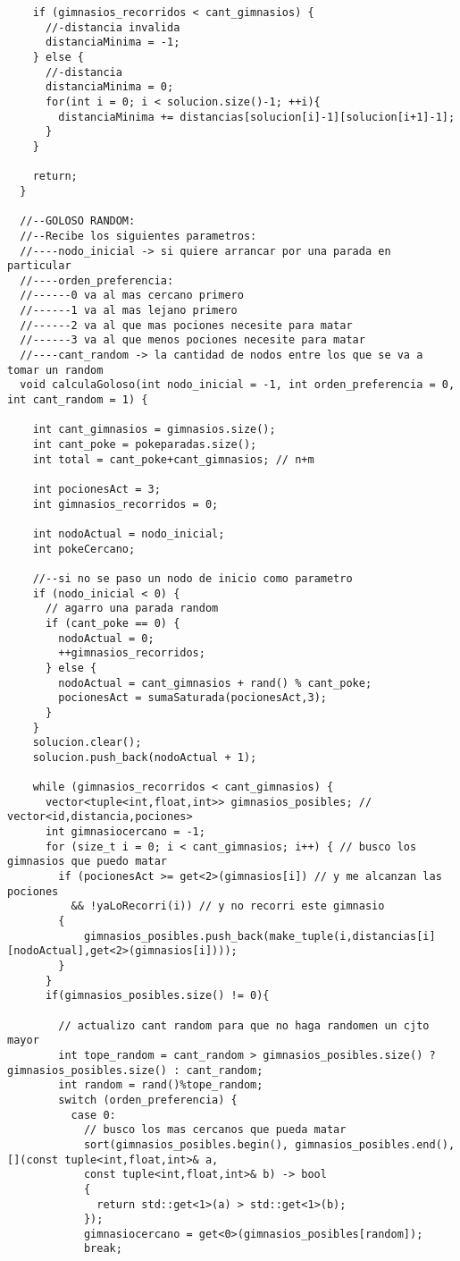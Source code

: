 \begin{lstlisting}
    if (gimnasios_recorridos < cant_gimnasios) {
      //-distancia invalida
      distanciaMinima = -1;
    } else {
      //-distancia
      distanciaMinima = 0;
      for(int i = 0; i < solucion.size()-1; ++i){
        distanciaMinima += distancias[solucion[i]-1][solucion[i+1]-1];
      }
    }

    return;
  }

  //--GOLOSO RANDOM:
  //--Recibe los siguientes parametros:
  //----nodo_inicial -> si quiere arrancar por una parada en particular
  //----orden_preferencia:
  //------0 va al mas cercano primero
  //------1 va al mas lejano primero
  //------2 va al que mas pociones necesite para matar
  //------3 va al que menos pociones necesite para matar
  //----cant_random -> la cantidad de nodos entre los que se va a tomar un random
  void calculaGoloso(int nodo_inicial = -1, int orden_preferencia = 0, int cant_random = 1) {

    int cant_gimnasios = gimnasios.size();
    int cant_poke = pokeparadas.size();
    int total = cant_poke+cant_gimnasios; // n+m

    int pocionesAct = 3;
    int gimnasios_recorridos = 0;

    int nodoActual = nodo_inicial;
    int pokeCercano;

    //--si no se paso un nodo de inicio como parametro
    if (nodo_inicial < 0) {
      // agarro una parada random
      if (cant_poke == 0) {
        nodoActual = 0;
        ++gimnasios_recorridos;
      } else {
        nodoActual = cant_gimnasios + rand() % cant_poke;
        pocionesAct = sumaSaturada(pocionesAct,3);
      }
    }
    solucion.clear();
    solucion.push_back(nodoActual + 1);

    while (gimnasios_recorridos < cant_gimnasios) {
      vector<tuple<int,float,int>> gimnasios_posibles; // vector<id,distancia,pociones>
      int gimnasiocercano = -1;
      for (size_t i = 0; i < cant_gimnasios; i++) { // busco los gimnasios que puedo matar
        if (pocionesAct >= get<2>(gimnasios[i]) // y me alcanzan las pociones
          && !yaLoRecorri(i)) // y no recorri este gimnasio
        {
            gimnasios_posibles.push_back(make_tuple(i,distancias[i][nodoActual],get<2>(gimnasios[i])));
        }
      }
      if(gimnasios_posibles.size() != 0){

        // actualizo cant random para que no haga randomen un cjto mayor
        int tope_random = cant_random > gimnasios_posibles.size() ? gimnasios_posibles.size() : cant_random;
        int random = rand()%tope_random;
        switch (orden_preferencia) {
          case 0:
            // busco los mas cercanos que pueda matar
            sort(gimnasios_posibles.begin(), gimnasios_posibles.end(), [](const tuple<int,float,int>& a,
            const tuple<int,float,int>& b) -> bool
            {
              return std::get<1>(a) > std::get<1>(b);
            });
            gimnasiocercano = get<0>(gimnasios_posibles[random]);
            break;


\end{lstlisting}
